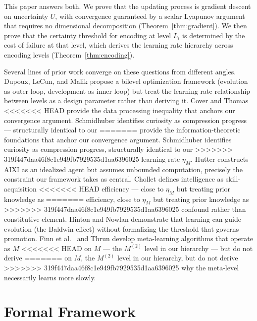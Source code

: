 \documentclass[11pt]{article}
\theoremstyle{definition}
\begin{document}
This paper answers both. We prove that the updating process is
gradient descent on uncertainty $U$, with convergence guaranteed by a
scalar Lyapunov argument that requires no dimensional decomposition
(Theorem~\ref{thm:gradient}). We then prove that the certainty
threshold for encoding at level $L_i$ is determined by the cost of
failure at that level, which derives the learning rate hierarchy across
encoding levels (Theorem~\ref{thm:encoding}).

Several lines of prior work converge on these questions from different
angles. Dupoux, LeCun, and Malik \cite{DupouxLeCunMalik2026} propose
a bilevel optimization framework (evolution as outer loop, development
as inner loop) but treat the learning rate relationship between levels
as a design parameter rather than deriving it. Cover and Thomas
<<<<<<< HEAD
\cite{Cover2006} provide the data processing inequality that anchors
our convergence argument. Schmidhuber \cite{Schmidhuber2010} identifies
curiosity as compression progress --- structurally identical to our
=======
\cite{Cover2006} provide the information-theoretic foundations that
anchor our convergence argument. Schmidhuber \cite{Schmidhuber2010} identifies
curiosity as compression progress, structurally identical to our
>>>>>>> 319f447daa46f8c1e949fb7929535d1aa6396025
learning rate $\eta_M$. Hutter \cite{Hutter2005} constructs AIXI as
an idealized agent but assumes unbounded computation, precisely the
constraint our framework takes as central. Chollet
\cite{Chollet2019} defines intelligence as skill-acquisition
<<<<<<< HEAD
efficiency --- close to $\eta_M$ but treating prior knowledge as
=======
efficiency, close to $\eta_M$ but treating prior knowledge as
>>>>>>> 319f447daa46f8c1e949fb7929535d1aa6396025
confound rather than constitutive element. Hinton and Nowlan
\cite{Hinton1987} demonstrate that learning can guide evolution (the
Baldwin effect) without formalizing the threshold that governs
promotion. Finn et al.\ \cite{FinnEtAl2017} and Thrun
\cite{Thrun1998} develop meta-learning algorithms that operate as $M$
<<<<<<< HEAD
on $M$ --- the $M^{(2)}$ level in our hierarchy --- but do not derive
=======
on $M$, the $M^{(2)}$ level in our hierarchy, but do not derive
>>>>>>> 319f447daa46f8c1e949fb7929535d1aa6396025
why the meta-level necessarily learns more slowly.

\section{Formal Framework}
\label{sec:framework}
\end{document}
